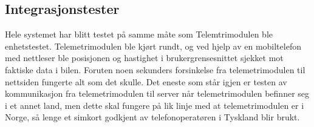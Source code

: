 \subsection{Integrasjonstester}
Hele systemet har blitt testet på samme måte som Telemtrimodulen ble enhetstestet. Telemetrimodulen ble kjørt rundt, og ved hjelp av en mobiltelefon med nettleser ble posisjonen og hastighet i brukergrensesnittet sjekket mot faktiske data i bilen.
Foruten noen sekunders forsinkelse fra telemetrimodulen til nettsiden fungerte alt som det skulle. Det eneste som står igjen er testen av kommunikasjon fra telemetrimodulen til server når telemetrimodulen befinner seg i et annet land, men dette skal fungere på lik linje med at telemetrimodulen er i Norge, så lenge et simkort godkjent av telefonoperatøren i Tyskland blir brukt.